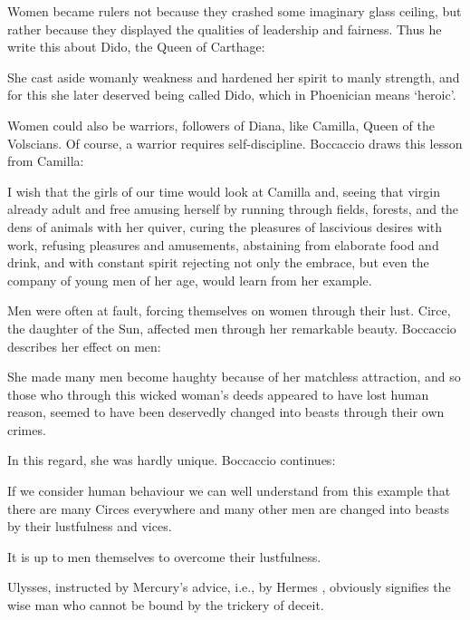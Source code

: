 Women became rulers not because they crashed some imaginary glass ceiling, but rather because they displayed the qualities of leadership and fairness. Thus he write this about Dido, the Queen of Carthage:

\begin{quotex}
She cast aside womanly weakness and hardened her spirit to manly strength, and for this she later deserved being called Dido, which in Phoenician means `heroic'.
\end{quotex}


Women could also be warriors, followers of Diana, like Camilla, Queen of the Volscians. Of course, a warrior requires self-discipline. Boccaccio draws this lesson from Camilla:

\begin{quotex}
I wish that the girls of our time would look at Camilla and, seeing that virgin already adult and free amusing herself by running through fields, forests, and the dens of animals with her quiver, curing the pleasures of lascivious desires with work, refusing pleasures and amusements, abstaining from elaborate food and drink, and with constant spirit rejecting not only the embrace, but even the company of young men of her age, would learn from her example.
\end{quotex}


Men were often at fault, forcing themselves on women through their lust. Circe, the daughter of the Sun, affected men through her remarkable beauty. Boccaccio describes her effect on men:

\begin{quotex}
She made many men become haughty because of her matchless attraction, and so those who through this wicked woman's deeds appeared to have lost human reason, seemed to have been deservedly changed into beasts through their own crimes.
\end{quotex}


In this regard, she was hardly unique. Boccaccio continues:

\begin{quotex}
If we consider human behaviour we can well understand from this example that there are many Circes everywhere and many other men are changed into beasts by their lustfulness and vices.
\end{quotex}


It is up to men themselves to overcome their lustfulness.

\begin{quotex}
Ulysses, instructed by Mercury's advice, i.e., by Hermes , obviously signifies the wise man who cannot be bound by the trickery of deceit.
\end{quotex}


